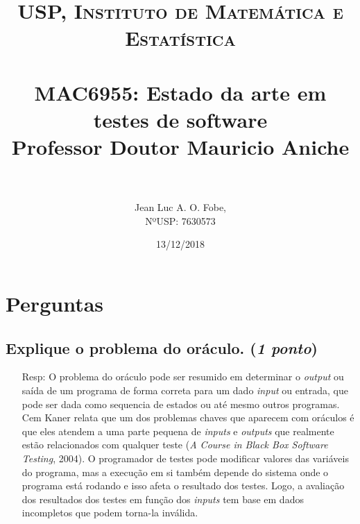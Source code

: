 \documentclass[paper=a4, fontsize=11pt]{scrartcl} %
\title{	
\normalfont \normalsize 
\textsc{USP, Instituto de Matemática e Estatística} \\ [25pt] %
\horrule{0.5pt} \\[0.4cm] %
\huge MAC6955: Estado da arte em testes de software \\ %
\normalfont \normalsize 
Professor Doutor Mauricio Aniche \\ [25pt]
\horrule{2pt} \\[0.5cm] %
}
\author{Jean Luc A. O. Fobe, \\
        NºUSP: 7630573} %
\date{13/12/2018} %
\numberwithin{equation}{section} %
\numberwithin{figure}{section} %
\numberwithin{table}{section} %
\begin{document}
\maketitle %

\section{Perguntas}
\subsection{Explique o problema do oráculo. (\textit{1 ponto})}
\begin{itemize}
    \item[Resp:] O problema do oráculo pode ser resumido em determinar o \textit{output} ou saída de um programa de forma correta para um dado \textit{input} ou entrada, que pode ser dada como sequencia de estados ou até mesmo outros programas.\\
    Cem Kaner relata que um dos problemas chaves que aparecem com oráculos é que eles atendem a uma parte pequena de \textit{inputs} e \textit{outputs} que realmente estão relacionados com qualquer teste (\textit{A Course in Black Box Software Testing}, 2004). O programador de testes pode modificar valores das variáveis do programa, mas a execução em si também depende do sistema onde o programa está rodando e isso afeta o resultado dos testes. Logo, a avaliação dos resultados dos testes em função dos \textit{inputs} tem base em dados incompletos que podem torna-la inválida.
\end{itemize}
\end{document}

